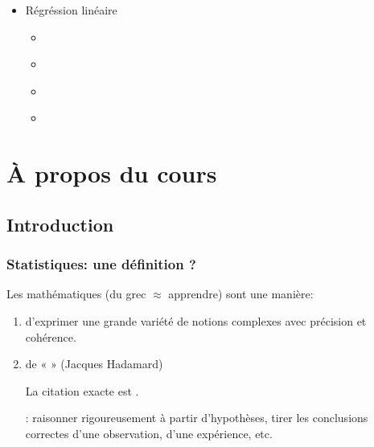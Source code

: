 \documentclass[letterpaper,10pt,english]{jupyterBook}
\begin{document}
\begin{itemize}
\item {} 
\sphinxAtStartPar
Régréssion linéaire

\begin{itemize}
\item {} 
\sphinxAtStartPar
{\hyperref[\detokenize{R_xe9gr_xe9ssion_lin_xe9aire/introduction::doc}]{}}

\item {} 
\sphinxAtStartPar
{\hyperref[\detokenize{R_xe9gr_xe9ssion_lin_xe9aire/cas_general::doc}]{}}

\item {} 
\sphinxAtStartPar
{\hyperref[\detokenize{R_xe9gr_xe9ssion_lin_xe9aire/tests::doc}]{}}

\item {} 
\sphinxAtStartPar
{\hyperref[\detokenize{R_xe9gr_xe9ssion_lin_xe9aire/hypotheses_et_diagnostics::doc}]{}}

\end{itemize}
\end{itemize}

\sphinxstepscope


\part{À propos du cours}

\sphinxstepscope


\chapter{Introduction}
\label{\detokenize{Introduction:introduction}}\label{\detokenize{Introduction::doc}}

\section{Statistiques: une définition ?}
\label{\detokenize{Introduction:statistiques-une-definition}}
\sphinxAtStartPar
Les mathématiques (du grec  \(\approx\) apprendre) sont une manière:
\begin{enumerate}
%
\item {} 
\sphinxAtStartPar
d’exprimer une grande variété de notions complexes avec précision et cohérence.

\item {} 
\sphinxAtStartPar
de «  » (Jacques Hadamard)
%
\begin{footnote}[1]\sphinxAtStartFootnote
La citation exacte est .
%
\end{footnote}
: raisonner rigoureusement à partir d’hypothèses, tirer les conclusions correctes d’une observation, d’une expérience, etc.

\end{enumerate}
\end{document}
